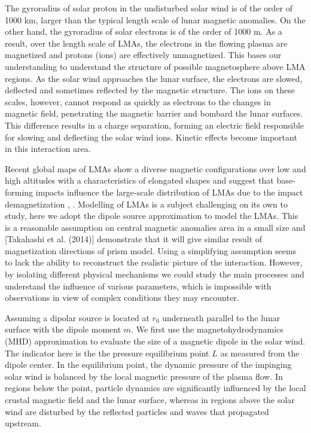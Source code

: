 The gyroradius of solar proton in the undisturbed solar wind is of the order of 1000 km, larger than the typical length scale of lunar magnetic anomalies. On the other hand, the gyroradius of solar electrons is of the order of 1000 m. As a result, over the length scale of LMAs, the electrons in the flowing plasma are magnetized and protons (ions) are effectively unmagnetized. This bases our understanding to understand the structure of possible magnetosphere above LMA regions. As the solar wind approaches the lunar surface, the electrons are slowed, deflected and sometimes reflected by the magnetic structure. The ions on these scales, however, cannot respond as quickly as electrons to the changes in magnetic field, penetrating the magnetic barrier and bombard the lunar surfaces. This difference results in a charge separation, forming an electric field responsible for slowing and deflecting the solar wind ions. Kinetic effects become important in this interaction area.

Recent global maps of LMAs show a diverse magnetic configurations over low and high altitudes with a characteristics of elongated shapes and suggest that base-forming impacts influence the large-scale distribution of LMAs due to the impact demagnetization \citep{tsunakawaSurfaceVectorMapping2015}, \cite{mitchellGlobalMappingLunar2008}. Modelling of LMAs is a subject challenging on its own to study, here we adopt the dipole source approximation to model the LMAs. This is a reasonable assumption on central magnetic anomalies area in a small size and [Takahashi et al. (2014)]\citep{takahashiReorientationEarlyLunar2014} demonstrate that it will give similar result of magnetization directions of prism model. Using a simplifying assumption seems to lack the ability to reconstruct the realistic picture of the interaction. However, by isolating different physical mechanisms we could study the main processes and understand the influence of various parameters, which is impossible with observations in view of complex conditions they may encounter.


Assuming a dipolar source is located at $r_0$ underneath parallel to the lunar surface with the dipole moment $m$. We first use the magnetohydrodynamics (MHD) approximation to evaluate the size of a magnetic dipole in the solar wind. The indicator here is the the pressure equilibrium point $L$ as measured from the dipole center. In the equilibrium point, the dynamic pressure of the impinging solar wind is balanced by the local magnetic pressure of the plasma flow. In regions below the point, particle dynamics are significantly influenced by the local crustal magnetic field and the lunar surface, whereas in regions above the solar wind are disturbed by the reflected particles and waves that propagated upstream.

